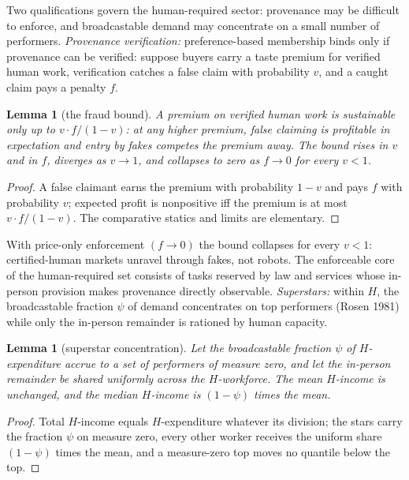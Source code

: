 \documentclass[12pt]{article}
\theoremstyle{plain}
\newtheorem{lemma}[proposition]{Lemma}
\begin{document}
Two qualifications govern the human-required sector: provenance may be difficult to enforce, and broadcastable demand may concentrate on a small number of performers. \emph{Provenance verification:} preference-based membership binds only if provenance can be verified: suppose buyers carry a taste premium for verified human work, verification catches a false claim with probability $v$, and a caught claim pays a penalty $f$.

\begin{lemma}[the fraud bound]\label{lem:fraud}
A premium on verified human work is sustainable only up to $v\cdot f/(1-v)$: at any higher premium, false claiming is profitable in expectation and entry by fakes competes the premium away. The bound rises in $v$ and in $f$, diverges as $v \to 1$, and collapses to zero as $f \to 0$ for every $v < 1$.
\end{lemma}

\begin{proof}
A false claimant earns the premium with probability $1 - v$ and pays $f$ with probability $v$; expected profit is nonpositive iff the premium is at most $v\cdot f/(1-v)$. The comparative statics and limits are elementary.
\end{proof}

With price-only enforcement $(f \to 0)$ the bound collapses for every $v < 1$: certified-human markets unravel through fakes, not robots. The enforceable core of the human-required set consists of tasks reserved by law and services whose in-person provision makes provenance directly observable. \emph{Superstars:} within $H$, the broadcastable fraction $\psi$ of demand concentrates on top performers (Rosen 1981) while only the in-person remainder is rationed by human capacity.

\begin{lemma}[superstar concentration]\label{lem:superstar}
Let the broadcastable fraction $\psi$ of $H$-expenditure accrue to a set of performers of measure zero, and let the in-person remainder be shared uniformly across the $H$-workforce. The mean $H$-income is unchanged, and the median $H$-income is $(1-\psi )$ times the mean.
\end{lemma}

\begin{proof}
Total $H$-income equals $H$-expenditure whatever its division; the stars carry the fraction $\psi$ on measure zero, every other worker receives the uniform share $(1-\psi )$ times the mean, and a measure-zero top moves no quantile below the top.
\end{proof}
\end{document}
